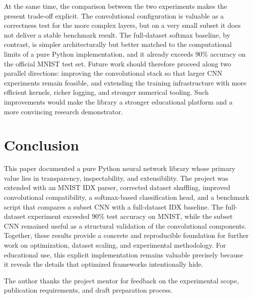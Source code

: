 \documentclass[]{ceurart}
\begin{document}
At the same time, the comparison between the two experiments makes the present trade-off explicit. The convolutional configuration is valuable as a correctness test for the more complex layers, but on a very small subset it does not deliver a stable benchmark result. The full-dataset softmax baseline, by contrast, is simpler architecturally but better matched to the computational limits of a pure Python implementation, and it already exceeds 90\% accuracy on the official MNIST test set. Future work should therefore proceed along two parallel directions: improving the convolutional stack so that larger CNN experiments remain feasible, and extending the training infrastructure with more efficient kernels, richer logging, and stronger numerical tooling. Such improvements would make the library a stronger educational platform and a more convincing research demonstrator.

\section{Conclusion}
This paper documented a pure Python neural network library whose primary value lies in transparency, inspectability, and extensibility. The project was extended with an MNIST IDX parser, corrected dataset shuffling, improved convolutional compatibility, a softmax-based classification head, and a benchmark script that compares a subset CNN with a full-dataset IDX baseline. The full-dataset experiment exceeded 90\% test accuracy on MNIST, while the subset CNN remained useful as a structural validation of the convolutional components. Together, these results provide a concrete and reproducible foundation for further work on optimization, dataset scaling, and experimental methodology. For educational use, this explicit implementation remains valuable precisely because it reveals the details that optimized frameworks intentionally hide.

\begin{acknowledgments}
The author thanks the project mentor for feedback on the experimental scope, publication requirements, and draft preparation process.
\end{acknowledgments}


\end{document}
